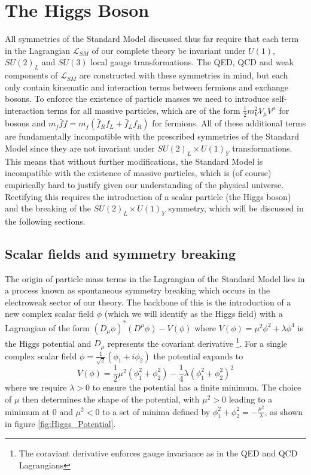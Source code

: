 \section{The Higgs Boson}

All symmetries of the Standard Model discussed thus far require that each term in the Lagrangian 
$\mathcal{L}_{SM}$ of our complete theory be invariant under $U(1)$, $SU(2)_L$ and $SU(3)$ local gauge 
transformations. The QED, QCD and weak components of $\mathcal{L}_{SM}$ are constructed with these symmetries 
in mind, but each only contain kinematic and interaction terms between fermions and exchange bosons. To enforce 
the existence of particle masses we need to introduce self-interaction terms for all massive particles, which are of the 
form $\frac{1}{2}m_V^2V_{\mu}V^{\mu}$ for bosons and $m_f\bar{f}f = m_f(\bar{f}_Rf_L + \bar{f}_Lf_R)$ for 
fermions. All of these additional terms are fundamentally incompatible with the prescribed symmetries of the Standard 
Model since they are not invariant under $SU(2)_L \times U(1)_Y$ transformations. This means that without further 
modifications, the Standard Model is incompatible with the existence of massive particles, which is (of course) 
empirically hard to justify given our understanding of the physical universe. Rectifying this requires the introduction of 
a scalar particle (the Higgs boson) and the breaking of the $SU(2)_L \times U(1)_Y$ symmetry, which will be 
discussed in the following sections.

\subsection{Scalar fields and symmetry breaking}

The origin of particle mass terms in the Lagrangian of the Standard Model lies in a process known as spontaneous 
symmetry breaking \cite{higgs-broken-symmetries, englert-broken-symmetries} which occurs in the electroweak 
sector of our theory. The backbone of this is the introduction of a new complex scalar field $\phi$ (which we will 
identify as the Higgs field) with a Lagrangian of the form $(D_{\mu}\phi)^*(D^{\mu}\phi) - V(\phi)$ where 
$V(\phi) = \mu^2\phi^2 + \lambda\phi^4$ is the Higgs potential and $D_{\mu}$ represents the covariant 
derivative \footnote{The coraviant derivative enforces gauge invariance as in the QED and QCD Lagrangians}. For 
a single complex scalar field $\phi = \frac{1}{\sqrt{2}}(\phi_1 + i\phi_2)$ the potential expands to
\begin{equation}
V(\phi) = \frac{1}{2}\mu^2(\phi_1^2 + \phi_2^2) - \frac{1}{4}\lambda(\phi_1^2 + \phi_2^2)^2
\end{equation}
where we require $\lambda > 0$ to ensure the potential has a finite minimum. The choice of $\mu$ then determines 
the shape of the potential, with $\mu^2 > 0$ leading to a minimum at 0 and $\mu^2 < 0$ to a set of minima defined 
by $\phi_1^2 + \phi_2^2 = -\frac{\mu^2}{\lambda}$, as shown in figure \ref{fig:Higgs_Potential}. 

